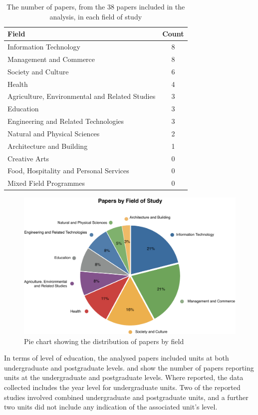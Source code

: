 \begin{table}[p]
	\centering
	\caption{The number of papers, from the 38 papers included in the analysis, in each field of study}
	\label{tbl:degrees}
	\footnotesize
    \begin{tabular}{lc}
    \textbf{Field} & \textbf{Count} \\ \hline
    Information Technology & 8 \\
	Management and Commerce &	8 \\
	Society and Culture &	6 \\
	Health &	4 \\
	Agriculture, Environmental and Related Studies &	3 \\
	Education &	3 \\
	Engineering and Related Technologies &	3 \\
	Natural and Physical Sciences &	2 \\
	Architecture and Building &	1 \\
	Creative Arts &	0 \\
	Food, Hospitality and Personal Services &	0 \\
	Mixed Field Programmes &	0 \\
    \end{tabular}
\end{table}

\begin{figure}[p]
	\centering
	\includegraphics[width=\textwidth]{Degrees}
	\caption{Pie chart showing the distribution of papers by field}
	\label{fig:degree_dist}
\end{figure}

In terms of level of education, the analysed papers included units at both undergraduate and postgraduate levels.  and  show the number of papers reporting units at the undergraduate and postgraduate levels. Where reported, the data collected includes the year level for undergraduate units. Two of the reported studies involved combined undergraduate and postgraduate units, and a further two units did not include any indication of the associated unit's level.


